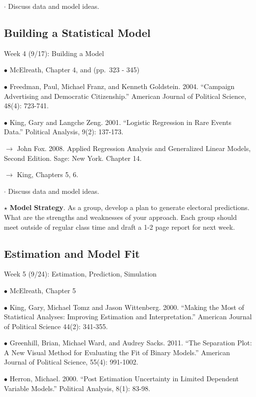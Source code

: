 \documentclass[
]{book}
\begin{document}
\(\cdot\) Discuss data and model ideas.

\subsection{Building a Statistical Model}\label{building-a-statistical-model}

Week 4 (9/17): Building a Model

\(\bullet\) McElreath, Chapter 4, and (pp.~323 - 345)

\(\bullet\) Freedman, Paul, Michael Franz, and Kenneth Goldstein. 2004. ``Campaign Advertising and Democratic Citizenship.'' American Journal of Political Science, 48(4): 723-741.

\(\bullet\) King, Gary and Langche Zeng. 2001. ``Logistic Regression in Rare Events Data.'' Political Analysis, 9(2): 137-173.

\(\rightarrow\) John Fox. 2008. Applied Regression Analysis and Generalized Linear Models, Second Edition. Sage: New York. Chapter 14.

\(\rightarrow\) King, Chapters 5, 6.

\(\cdot\) Discuss data and model ideas.

\(\star\) \textbf{Model} \textbf{Strategy}. As a group, develop a plan to generate electoral predictions. What are the strengths and weaknesses of your approach. Each group should meet outside of regular class time and draft a 1-2 page report for next week.

\subsection{Estimation and Model Fit}\label{estimation-and-model-fit}

Week 5 (9/24): Estimation, Prediction, Simulation

\(\bullet\) McElreath, Chapter 5

\(\bullet\) King, Gary, Michael Tomz and Jason Wittenberg. 2000. ``Making the Most of Statistical Analyses: Improving Estimation and Interpretation.'' American Journal of Political Science 44(2): 341-355.

\(\bullet\) Greenhill, Brian, Michael Ward, and Audrey Sacks. 2011. ``The Separation Plot: A New Visual Method for Evaluating the Fit of Binary Models.'' American Journal of Political Science, 55(4): 991-1002.

\(\bullet\) Herron, Michael. 2000. ``Post Estimation Uncertainty in Limited Dependent Variable Models.'' Political Analysis, 8(1): 83-98.
\end{document}
